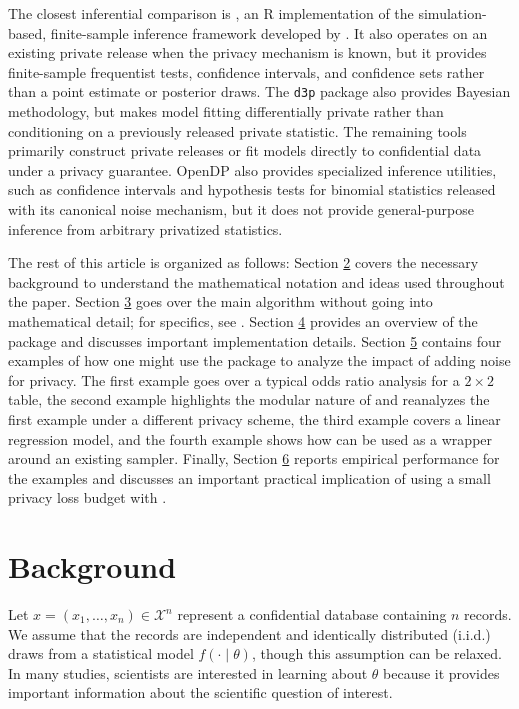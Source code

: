 The closest inferential comparison is  \citep{SimBaRepro_pkg},
an R implementation of the simulation-based, finite-sample inference framework
developed by \citet{Awan2025}. It also operates on an existing private release when the
privacy mechanism is known, but it provides finite-sample frequentist tests,
confidence intervals, and confidence sets rather than a point estimate or
posterior draws. The \texttt{d3p} package also
provides Bayesian methodology, but makes model fitting differentially private
rather than conditioning on a previously released private statistic. The
remaining tools primarily construct private releases or fit models directly to
confidential data under a privacy guarantee. OpenDP also provides specialized
inference utilities, such as confidence intervals and hypothesis tests for
binomial statistics released with its canonical noise mechanism, but
it does not provide general-purpose inference from arbitrary privatized statistics.

The rest of this article is organized as follows:
Section \hyperref[sec:background]{2} covers the necessary background to understand the mathematical notation
and ideas used throughout the paper. Section \hyperref[sec:methodology]{3} goes over the main algorithm without
going into mathematical detail; for specifics, see \citet{Ju2022}. Section \hyperref[sec:structure]{4} provides
an overview of the  package and discusses important implementation details.
Section \hyperref[sec:examples]{5} contains four examples of how one might use the package to analyze the
impact of adding noise for privacy. The first example goes over a typical
odds ratio analysis for a \(2 \times 2\) table, the second example highlights
the modular nature of  and reanalyzes the first example under a different
privacy scheme, the third example covers a linear regression model, and the fourth example
shows how  can be used as a wrapper around an existing sampler. Finally, Section \hyperref[sec:computation]{6}
reports empirical performance for the examples and discusses an important practical implication of using a small
privacy loss budget with .

\section{Background}\label{sec:background}

Let \(x = (x_1, \ldots, x_n) \in \mathcal{X}^n\) represent a confidential
database containing \(n\) records. We assume that the records are independent and
identically distributed (i.i.d.) draws from a statistical model
\(f(\cdot \mid \theta)\), though this assumption can be relaxed. In many studies,
scientists are interested in learning about \(\theta\) because it provides important information about the scientific question of interest.

